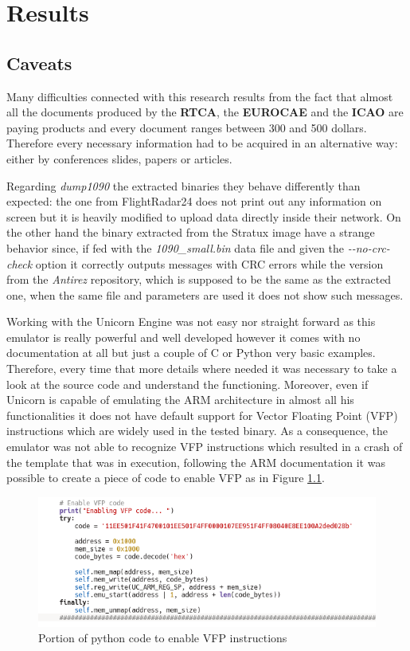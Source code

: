 \documentclass[../main.tex]{subfiles}
\begin{document}
\chapter{Results}
\label{chap:resconc}

\section{Caveats}

Many difficulties connected with this research results from the fact that almost all the documents produced by the \textbf{RTCA}, the \textbf{EUROCAE} and the \textbf{ICAO} are paying products and every document ranges between 300 and 500 dollars. Therefore every necessary information had to be acquired in an alternative way: either by conferences slides, papers or articles.

Regarding \textit{dump1090} the extracted binaries they behave differently than expected: the one from FlightRadar24 does not print out any information on screen but it is heavily modified to upload data directly inside their network. On the other hand the binary extracted from the Stratux image have a strange behavior since, if fed with the \textit{1090\_small.bin} data file and given the \textit{-{}-no-crc-check} option it correctly outputs messages with CRC errors while the version from the \textit{Antirez} repository, which is supposed to be the same as the extracted one, when the same file and parameters are used it does not show such messages.

Working with the Unicorn Engine was not easy nor straight forward as this emulator is really powerful and well developed however it comes with no documentation at all but just a couple of C or Python very basic examples. Therefore, every time that more details where needed it was necessary to take a look at the source code and understand the functioning. Moreover, even if Unicorn is capable of emulating the ARM architecture in almost all his functionalities it does not have default support for Vector Floating Point (VFP) instructions which are widely used in the tested binary. As a consequence, the emulator was not able to recognize VFP instructions which resulted in a crash of the template that was in execution, following the ARM documentation it was possible to create a piece of code to enable VFP as in Figure \ref{fig:vfp}.

\begin{figure}[htp]
  \centering
  \includegraphics[scale=0.9]{images/vfpcode.png}
  \caption{Portion of python code to enable VFP instructions}
  \label{fig:vfp}
\end{figure}
\end{document}
